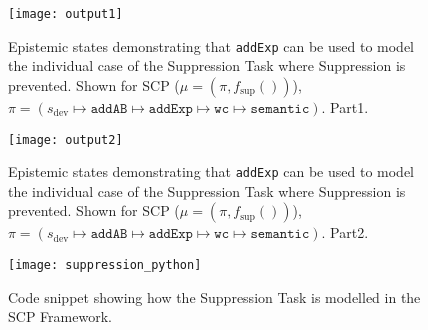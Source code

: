 \begin{figure}
\centering \texttt{[image: output1]}
\caption{Epistemic states demonstrating that \texttt{addExp} can be used to model the individual case of the Suppression Task where Suppression is prevented. Shown for SCP ($\mu=(\pi,f_\text{sup}())$), $\pi = (s_\text{dev} \longmapsto \texttt{addAB} \longmapsto \texttt{addExp} \longmapsto \texttt{wc} \longmapsto \texttt{semantic} )$. Part1.}
\label{fig:suppression_python}
\end{figure}
\begin{figure}
\centering \texttt{[image: output2]}
\caption{Epistemic states demonstrating that \texttt{addExp} can be used to model the individual case of the Suppression Task where Suppression is prevented. Shown for SCP ($\mu=(\pi,f_\text{sup}())$), $\pi = (s_\text{dev} \longmapsto \texttt{addAB} \longmapsto \texttt{addExp} \longmapsto \texttt{wc} \longmapsto \texttt{semantic} )$. Part2.}
\label{fig:suppression_python2}
\end{figure}

\begin{figure}
\centering \texttt{[image: suppression\_python]}
\caption{Code snippet showing how the Suppression Task is modelled in the SCP Framework.}
\label{fig:sup_snippet}
\end{figure}

